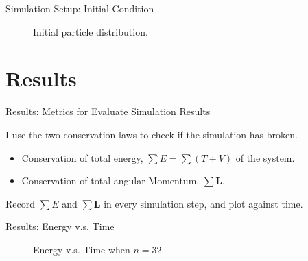 \documentclass[10pt, xcolor = svgnames, aspectratio=43]{beamer} %
\begin{document}
\begin{frame}{Simulation Setup: Initial Condition}
\begin{figure}
\caption{Initial particle distribution.}
\label{Initial-particle-distribution}
\end{figure}
\end{frame}







\section{Results}



\begin{frame}{Results: Metrics for Evaluate Simulation Results}

I use the two conservation laws to check if the simulation has broken.

\begin{itemize}
	\item Conservation of total energy, $\sum E = \sum \left( T + V \right) $ of the system.
	\item Conservation of total angular Momentum, $\sum \mathbf{L}$.
\end{itemize}

Record $\sum E$ and $\sum \mathbf{L}$ in every simulation step, and plot against time.
\end{frame}



\begin{frame}{Results: Energy v.s. Time}
\begin{figure}
\caption{Energy v.s. Time when $n = 32$.}
\label{E-T32}
\end{figure}
\end{frame}
\end{document}

